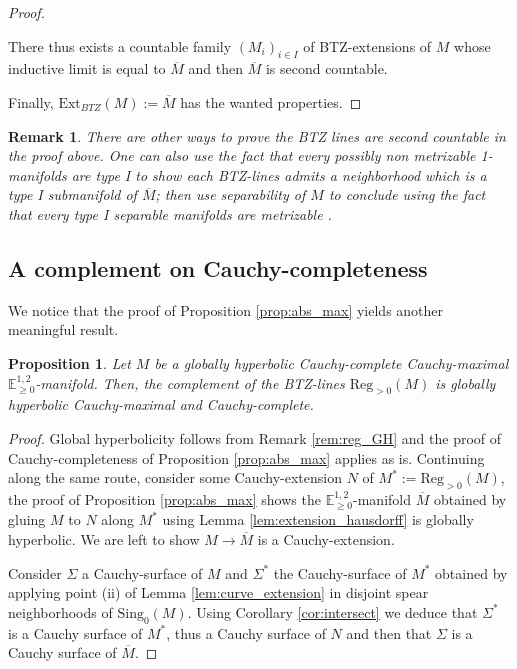 \documentclass[a4paper,12pt]{article}
\def\sing{\mathrm{Sing}}
\newcommand{\mass}[1]{{\mathbb E}^{1,2}_{#1}}
\def\Reg{\mathrm{Reg}}
\def\BTZext{\mathrm{Ext}_{BTZ}}
\def\reg{\Reg}
\newtheorem{propou}[lemou]{Proposition}
\newtheorem{remark}{Remark}             %
\begin{document}
\begin{proof}
\begin{itemize}
				 There thus exists a countable family $(M_i)_{i\in I}$ of BTZ-extensions  of $M$ whose inductive limit is equal to $\overline M$  and then $\overline M$ is second countable.
				 
			
	
			\end{itemize}

			
			
   Finally, $\BTZext(M) := \overline M $ has the wanted properties.
		\end{proof}
		
\begin{remark}
 There are other ways to prove the BTZ lines are second countable in the proof above. One can also use the fact that every possibly non metrizable 1-manifolds are type I \cite{MR3244277} to show each BTZ-lines admits a neighborhood which is a type I submanifold of $\overline M$; then use separability of $M$ to conclude using the fact that every type I separable manifolds are metrizable \cite{MR3244277}. 
\end{remark}

\subsection{A complement on Cauchy-completeness}
			\label{sec:complete_stability}
                    
                We notice that the proof of Proposition \ref{prop:abs_max} yields another meaningful result. 
                \begin{propou}\label{prop:reg_complete}
                  Let $M$ be a globally hyperbolic Cauchy-complete Cauchy-maximal $\mass{\geq0}$-manifold. 
                  Then, the complement of the BTZ-lines $\reg_{>0}(M)$ is globally hyperbolic Cauchy-maximal and Cauchy-complete. 
                  \end{propou}
                  \begin{proof}
                   Global hyperbolicity follows from Remark \ref{rem:reg_GH} and the proof of Cauchy-complete\-ness of Proposition \ref{prop:abs_max} applies as is. Continuing along the same route, consider some Cauchy-extension $N$ of $M^*:=\reg_{>0}(M)$, the proof of Proposition \ref{prop:abs_max} shows the $\mass{\geq0}$-manifold $\overline M$ obtained by gluing $M$ to $N$ along $M^*$ using Lemma \ref{lem:extension_hausdorff} is globally hyperbolic. We are left to show $M\rightarrow \overline M$ is a Cauchy-extension. 
                
                   
                   Consider $\Sigma$ a Cauchy-surface of $M$ and $\Sigma^*$ the Cauchy-surface of $M^*$ obtained by applying point (ii) of Lemma \ref{lem:curve_extension} in disjoint spear neighborhoods of $\sing_0(M)$.          
                   Using Corollary \ref{cor:intersect} we deduce that $\Sigma^*$ is a Cauchy surface of $M^*$, thus a Cauchy surface of $N$ and then that  $\Sigma$ is a Cauchy surface of $\overline M$.
                  \end{proof}
\end{document}
